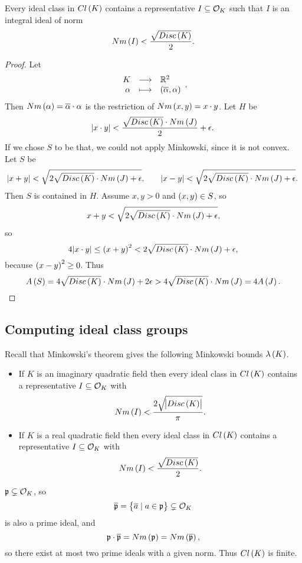 \begin{theorem}
Every ideal class in $ Cl\br{K} $ contains a representative $ I \subseteq \mathcal{O}_K $ such that $ I $ is an integral ideal of norm
$$ Nm\br{I} < \dfrac{\sqrt{Disc\br{K}}}{2}. $$
\end{theorem}

\begin{proof}
Let
$$ \function{K}{\R^2}{\alpha}{\br{\overline{\alpha}, \alpha}}. $$
Then $ Nm\br{\alpha} = \overline{\alpha} \cdot \alpha $ is the restriction of $ Nm\br{x, y} = x \cdot y $. Let $ H $ be
$$ \abs{x \cdot y} < \dfrac{\sqrt{Disc\br{K}} \cdot Nm\br{J}}{2} + \epsilon. $$
If we chose $ S $ to be that, we could not apply Minkowski, since it is not convex. Let $ S $ be
$$ \abs{x + y} < \sqrt{2\sqrt{Disc\br{K}} \cdot Nm\br{J} + \epsilon}, \qquad \abs{x - y} < \sqrt{2\sqrt{Disc\br{K}} \cdot Nm\br{J} + \epsilon}. $$
Then $ S $ is contained in $ H $. Assume $ x, y > 0 $ and $ \br{x, y} \in S $, so
$$ x + y < \sqrt{2\sqrt{Disc\br{K}} \cdot Nm\br{J} + \epsilon}, $$
so
$$ 4\abs{x \cdot y} \le \br{x + y}^2 < 2\sqrt{Disc\br{K}} \cdot Nm\br{J} + \epsilon, $$
because $ \br{x - y}^2 \ge 0 $. Thus
$$ A\br{S} = 4\sqrt{Disc\br{K}} \cdot Nm\br{J} + 2\epsilon > 4\sqrt{Disc\br{K}} \cdot Nm\br{J} = 4A\br{J}. $$
\end{proof}

\pagebreak

\subsection{Computing ideal class groups}


Recall that Minkowski's theorem gives the following Minkowski bounds $ \lambda\br{K} $.
\begin{itemize}
\item If $ K $ is an imaginary quadratic field then every ideal class in $ Cl\br{K} $ contains a representative $ I \subseteq \mathcal{O}_K $ with
$$ Nm\br{I} < \dfrac{2\sqrt{\abs{Disc\br{K}}}}{\pi}. $$
\item If $ K $ is a real quadratic field then every ideal class in $ Cl\br{K} $ contains a representative $ I \subseteq \mathcal{O}_K $ with
$$ Nm\br{I} < \dfrac{\sqrt{Disc\br{K}}}{2}. $$
\end{itemize}

\begin{note*}
$ \mathfrak{p} \subsetneq \mathcal{O}_K $, so
$$ \overline{\pp} = \cbr{\overline{a} \mid a \in \pp} \subsetneq \OO_K $$
is also a prime ideal, and
$$ \pp \cdot \overline{\pp} = Nm\br{\pp} = Nm\br{\overline{\pp}}, $$
so there exist at most two prime ideals with a given norm. Thus $ Cl\br{K} $ is finite.
\end{note*}

